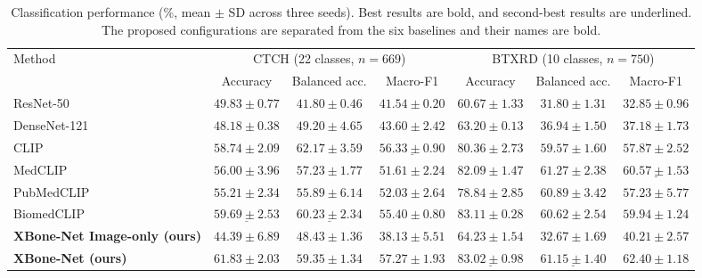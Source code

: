 \begin{table}[t]
\caption{Classification performance (\%, mean $\pm$ SD across three seeds). Best results are bold, and second-best results are underlined. The proposed configurations are separated from the six baselines and their names are bold.}
\label{tab:classification}
\centering\footnotesize
\setlength{\tabcolsep}{6pt}
\begin{tabular*}{\textwidth}{@{\extracolsep{\fill}}lcccccc@{}}
\toprule
Method & \multicolumn{3}{c}{CTCH (22 classes, $n=669$)} & \multicolumn{3}{c}{BTXRD (10 classes, $n=750$)} \\
\cmidrule(lr){2-4}\cmidrule(l){5-7}
 & Accuracy & Balanced acc. & Macro-F1 & Accuracy & Balanced acc. & Macro-F1 \\
\midrule
ResNet-50 & $49.83\pm0.77$ & $41.80\pm0.46$ & $41.54\pm0.20$ & $60.67\pm1.33$ & $31.80\pm1.31$ & $32.85\pm0.96$ \\
DenseNet-121 & $48.18\pm0.38$ & $49.20\pm4.65$ & $43.60\pm2.42$ & $63.20\pm0.13$ & $36.94\pm1.50$ & $37.18\pm1.73$ \\
CLIP & $58.74\pm2.09$ & $\mathbf{62.17\pm3.59}$ & $\underline{56.33\pm0.90}$ & $80.36\pm2.73$ & $59.57\pm1.60$ & $57.87\pm2.52$ \\
MedCLIP & $56.00\pm3.96$ & $57.23\pm1.77$ & $51.61\pm2.24$ & $82.09\pm1.47$ & $\mathbf{61.27\pm2.38}$ & $\underline{60.57\pm1.53}$ \\
PubMedCLIP & $55.21\pm2.34$ & $55.89\pm6.14$ & $52.03\pm2.64$ & $78.84\pm2.85$ & $60.89\pm3.42$ & $57.23\pm5.77$ \\
BiomedCLIP & $\underline{59.69\pm2.53}$ & $\underline{60.23\pm2.34}$ & $55.40\pm0.80$ & $\mathbf{83.11\pm0.28}$ & $60.62\pm2.54$ & $59.94\pm1.24$ \\
\midrule
\textbf{XBone-Net Image-only (ours)} & $44.39\pm6.89$ & $48.43\pm1.36$ & $38.13\pm5.51$ & $64.23\pm1.54$ & $32.67\pm1.69$ & $40.21\pm2.57$ \\
\textbf{XBone-Net (ours)} & $\mathbf{61.83\pm2.03}$ & $59.35\pm1.34$ & $\mathbf{57.27\pm1.93}$ & $\underline{83.02\pm0.98}$ & $\underline{61.15\pm1.40}$ & $\mathbf{62.40\pm1.18}$ \\
\bottomrule
\end{tabular*}
\end{table}
